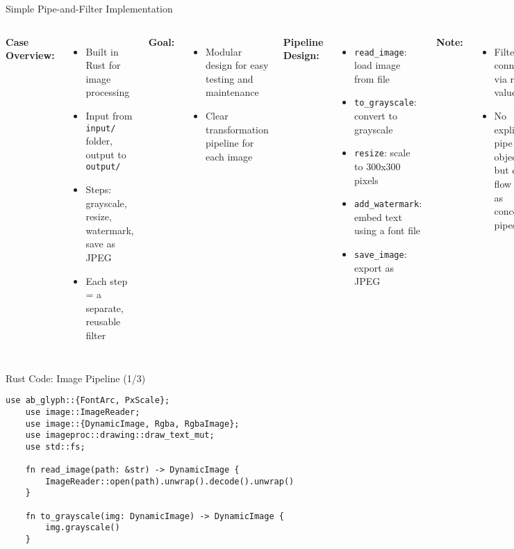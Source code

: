 \documentclass[aspectratio=169, table]{beamer}
\begin{document}
\begin{frame}[fragile]{Simple Pipe-and-Filter Implementation}
	\vspace{20pt}
	\begin{columns}[T]
		\textbf{Case Overview:}
		\begin{itemize}
			\item Built in Rust for image processing
			\item Input from \texttt{input/} folder, output to \texttt{output/}
			\item Steps: grayscale, resize, watermark, save as JPEG
			\item Each step = a separate, reusable filter
		\end{itemize}
		
		\textbf{Goal:}
		\begin{itemize}
			\item Modular design for easy testing and maintenance
			\item Clear transformation pipeline for each image
		\end{itemize}
		
		\textbf{Pipeline Design:}
		\begin{itemize}
			\item \texttt{read\_image}: load image from file
			\item \texttt{to\_grayscale}: convert to grayscale
			\item \texttt{resize}: scale to 300x300 pixels
			\item \texttt{add\_watermark}: embed text using a font file
			\item \texttt{save\_image}: export as JPEG
		\end{itemize}
		
		\textbf{Note:}
		\begin{itemize}
			\item Filters are connected via return values
			\item No explicit pipe objects, but data flow acts as conceptual pipes
		\end{itemize}
	\end{columns}
\end{frame}




\begin{frame}[fragile]{Rust Code: Image Pipeline (1/3)}
\vspace{10pt}
\begin{lstlisting}[style=RustStyle]
	use ab_glyph::{FontArc, PxScale};
	use image::ImageReader;
	use image::{DynamicImage, Rgba, RgbaImage};
	use imageproc::drawing::draw_text_mut;
	use std::fs;
	
	fn read_image(path: &str) -> DynamicImage {
		ImageReader::open(path).unwrap().decode().unwrap()
	}
	
	fn to_grayscale(img: DynamicImage) -> DynamicImage {
		img.grayscale()
	}
\end{lstlisting}
\end{frame}
\end{document}
